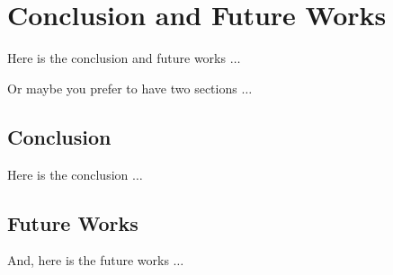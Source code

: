 \chapter{Conclusion and Future Works}
\label{ch:conclusion}

Here is the conclusion and future works $\ldots$

Or maybe you prefer to have two sections $\ldots$

\section{Conclusion}

Here is the conclusion $\ldots$

\section{Future Works}

And, here is the future works $\ldots$
